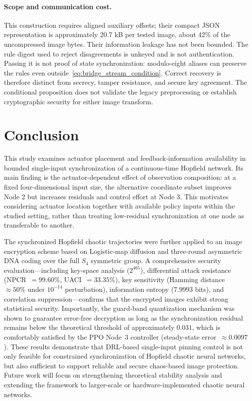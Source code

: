 \documentclass[a4paper,fleqn]{cas-sc}
\theoremstyle{plain}
\theoremstyle{definition}
\begin{document}
\paragraph{Scope and communication cost.}
This construction requires aligned auxiliary offsets; their compact JSON representation is approximately 20.7 kB per tested image, about 42\% of the uncompressed image bytes. Their information leakage has not been bounded. The rule digest used to reject disagreements is unkeyed and is not authentication. Passing it is not proof of state synchronization: modulo-eight aliases can preserve the rules even outside~\eqref{eq:bridge_stream_condition}. Correct recovery is therefore distinct from secrecy, tamper resistance, and secure key agreement. The conditional proposition does not validate the legacy preprocessing or establish cryptographic security for either image transform.

\section{Conclusion}
\label{sec:conclusion}

This study examines actuator placement and feedback-information availability in bounded single-input synchronization of a continuous-time Hopfield network. Its main finding is the actuator-dependent effect of observation composition: at a fixed four-dimensional input size, the alternative coordinate subset improves Node 2 but increases residuals and control effort at Node 3. This motivates considering actuator location together with available policy inputs within the studied setting, rather than treating low-residual synchronization at one node as transferable to another.

The synchronized Hopfield chaotic trajectories were further applied to an image encryption scheme based on Logistic-map diffusion and three-round asymmetric DNA coding over the full $S_4$ symmetric group. A comprehensive security evaluation---including key-space analysis ($2^{465}$), differential attack resistance (NPCR~$= 99.60\%$, UACI~$= 33.35\%$), key sensitivity (Hamming distance~$\approx 50\%$ under $10^{-14}$ perturbation), information entropy ($7.9993$ bits), and correlation suppression---confirms that the encrypted images exhibit strong statistical security. Importantly, the guard-band quantization mechanism was shown to guarantee error-free decryption as long as the synchronization residual remains below the theoretical threshold of approximately $0.031$, which is comfortably satisfied by the PPO Node~3 controller (steady-state error~$\approx 0.0097$). These results demonstrate that DRL-based single-input pinning control is not only feasible for constrained synchronization of Hopfield chaotic neural networks, but also sufficient to support reliable and secure chaos-based image protection. Future work will focus on strengthening theoretical stability analysis and extending the framework to larger-scale or hardware-implemented chaotic neural networks.
\end{document}
